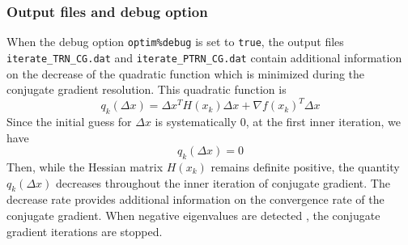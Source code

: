 \documentclass[a4paper,twoside,final,onecolumn,11pt,openright]{article}
\begin{document}
\subsubsection{Output files and debug option}
\label{qk}

When the debug option \texttt{optim\%debug} is set to \texttt{true}, the output files \texttt{iterate\_TRN\_CG.dat} and \texttt{iterate\_PTRN\_CG.dat} contain additional information on the decrease of the quadratic function which is minimized during the conjugate gradient resolution. This quadratic function is 
\begin{equation}
 q_k(\Delta x)= \Delta x^{T} H(x_k) \Delta x + \nabla f(x_k)^{T} \Delta x
\end{equation}
Since the initial guess for $\Delta x$ is systematically $0$, at the first inner iteration, we have 
\begin{equation}
 q_k(\Delta x)=0
\end{equation}
Then, while the Hessian matrix $H(x_k)$ remains definite positive, the quantity $q_k(\Delta x)$ decreases throughout the inner iteration of conjugate gradient. The decrease rate provides additional information on the convergence rate of the conjugate gradient. When negative eigenvalues are detected , the conjugate gradient iterations are stopped. 





\newpage 
\small

%

\end{document}

